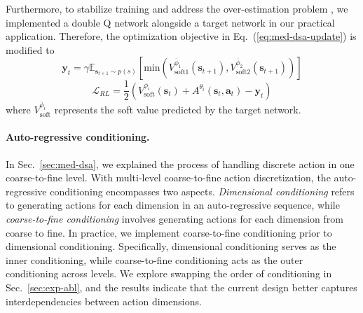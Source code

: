 Furthermore, to stabilize training and address the over-estimation problem \cite{fujimoto2018addressing, DoubleQ}, we implemented a double Q network alongside a target network in our practical application.
Therefore, the optimization objective in Eq.~(\ref{eq:med-dsa-update}) is modified to
\begin{equation}
    \mathbf{y}_t =  \gamma \mathbb{E}_{\mathbf{s}_{t+1} \sim p(s)} \left[ \text{min} \left( V^{\overline{\phi}_1}_{\text{soft}1}(\mathbf{s}_{t+1}), V^{\overline{\phi}_2}_{\text{soft}2} (\mathbf{s}_{t+1}) \right) \right]
\end{equation}
\begin{equation}
\label{eq:med-alg-rl}
    \mathcal{L}_{RL} = \frac{1}{2} \left( V^{\phi_i}_{\text{soft}}(\mathbf{s}_t) + A^{\theta_i}(\mathbf{s}_t, \mathbf{a}_t) - \mathbf{y}_t  \right)
\end{equation}
where $V^{\overline{\phi}_i}_{\text{soft}}$ represents the soft value predicted by the target network.

\paragraph{Auto-regressive conditioning.} 
\label{sec:med-alg-ar}
In Sec.~\ref{sec:med-dsa}, we explained the process of handling discrete action in one coarse-to-fine level.
With multi-level coarse-to-fine action discretization, the auto-regressive conditioning encompasses two aspects. 
\emph{Dimensional conditioning} refers to generating actions for each dimension in an auto-regressive sequence, while \emph{coarse-to-fine conditioning} involves generating actions for each dimension from coarse to fine. 
In practice, we implement coarse-to-fine conditioning prior to dimensional conditioning. 
Specifically, dimensional conditioning serves as the inner conditioning, while coarse-to-fine conditioning acts as the outer conditioning across levels. 
We explore swapping the order of conditioning in Sec.~\ref{sec:exp-abl}, and the results indicate that the current design better captures interdependencies between action dimensions.
